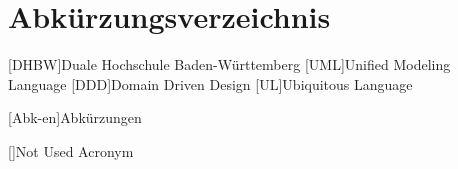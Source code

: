 %                                              
%

\chapter*{Abkürzungsverzeichnis} %

\begin{acronym}[12345678910]
	[DHBW]{Duale Hochschule Baden-Württemberg}
	[UML]{Unified Modeling Language}
	[DDD]{Domain Driven Design}
	[UL]{Ubiquitous Language}


	[Abk-en]{Abkürzungen}

	[]{Not Used Acronym}
	
\end{acronym}
